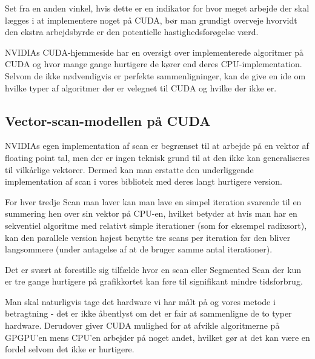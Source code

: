 Set fra en anden vinkel, hvis dette er en indikator for hvor meget arbejde der skal lægges i 
at implementere noget på CUDA, bør man grundigt overveje hvorvidt den ekstra arbejdsbyrde er 
den potentielle hastighedsforøgelse værd.

NVIDIAs CUDA-hjemmeside har en oversigt over implementerede algoritmer på CUDA og hvor mange
gange hurtigere de kører end deres CPU-implementation. Selvom de ikke nødvendigvis er perfekte
sammenligninger, kan de give en ide om hvilke typer af algoritmer der er velegnet til CUDA og 
hvilke der ikke er.

\subsection{Vector-scan-modellen på CUDA}

NVIDIAs egen implementation af scan er begrænset til at arbejde på en vektor af 
floating point tal, men der er ingen teknisk grund til at den ikke kan generaliseres 
til  vilkårlige vektorer. Dermed kan man erstatte den underliggende implementation 
af scan i vores bibliotek med deres langt hurtigere version.

For hver tredje Scan man laver kan man lave en simpel iteration svarende til en summering 
hen over sin vektor på CPU-en, hvilket betyder at hvis man har en sekventiel algoritme med 
relativt simple iterationer (som for eksempel radixsort), kan den parallele version højest
benytte tre scans per iteration før den bliver langsommere (under antagelse af at de bruger
samme antal iterationer).

Det er svært at forestille sig tilfælde hvor en scan eller Segmented Scan der kun er tre
gange hurtigere på grafikkortet kan føre til signifikant mindre tidsforbrug.

Man skal naturligvis tage det hardware vi har målt på og vores metode i betragtning - det
er ikke åbentlyst om det er fair at sammenligne de to typer hardware. Derudover giver CUDA
mulighed for at afvikle algoritmerne på GPGPU'en mens CPU'en arbejder på noget andet, 
hvilket gør at det kan være en fordel selvom det ikke er hurtigere.
